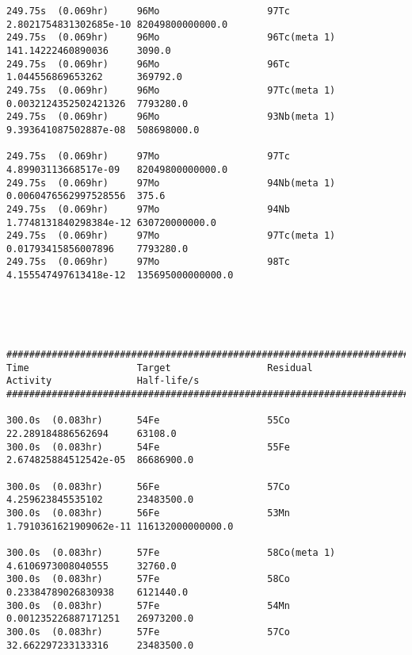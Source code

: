 \begin{lstlisting}[style=sOutputFile,caption={Final results for steel irradiation},label={listing:alexsteel}]
249.75s  (0.069hr)     96Mo                   97Tc                   2.8021754831302685e-10 82049800000000.0      
249.75s  (0.069hr)     96Mo                   96Tc(meta 1)           141.14222460890036     3090.0                
249.75s  (0.069hr)     96Mo                   96Tc                   1.044556869653262      369792.0              
249.75s  (0.069hr)     96Mo                   97Tc(meta 1)           0.0032124352502421326  7793280.0             
249.75s  (0.069hr)     96Mo                   93Nb(meta 1)           9.393641087502887e-08  508698000.0           

249.75s  (0.069hr)     97Mo                   97Tc                   4.89903113668517e-09   82049800000000.0      
249.75s  (0.069hr)     97Mo                   94Nb(meta 1)           0.0060476562997528556  375.6                 
249.75s  (0.069hr)     97Mo                   94Nb                   1.7748131840298384e-12 630720000000.0        
249.75s  (0.069hr)     97Mo                   97Tc(meta 1)           0.01793415856007896    7793280.0             
249.75s  (0.069hr)     97Mo                   98Tc                   4.155547497613418e-12  135695000000000.0     





####################################################################################################################
Time                   Target                 Residual               Activity               Half-life/s            
####################################################################################################################

300.0s  (0.083hr)      54Fe                   55Co                   22.289184886562694     63108.0               
300.0s  (0.083hr)      54Fe                   55Fe                   2.674825884512542e-05  86686900.0            

300.0s  (0.083hr)      56Fe                   57Co                   4.259623845535102      23483500.0            
300.0s  (0.083hr)      56Fe                   53Mn                   1.7910361621909062e-11 116132000000000.0     

300.0s  (0.083hr)      57Fe                   58Co(meta 1)           4.6106973008040555     32760.0               
300.0s  (0.083hr)      57Fe                   58Co                   0.23384789026830938    6121440.0             
300.0s  (0.083hr)      57Fe                   54Mn                   0.001235226887171251   26973200.0            
300.0s  (0.083hr)      57Fe                   57Co                   32.662297233133316     23483500.0            


\end{lstlisting}
